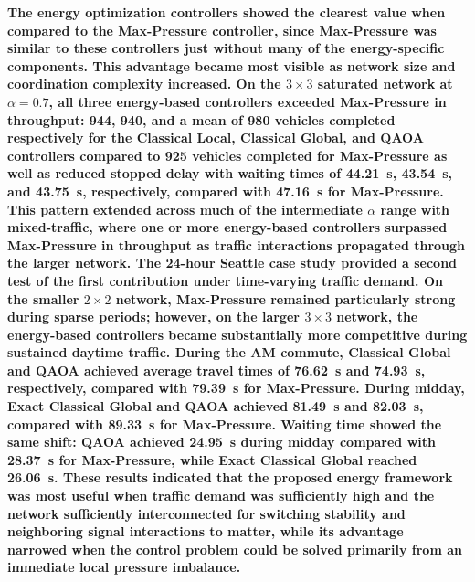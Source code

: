 \textbf{
The energy optimization controllers showed the clearest value when compared to the Max-Pressure controller, since Max-Pressure was similar to these controllers just without many of the energy-specific components. This advantage became most visible as network
size and coordination complexity increased. On the $3\times3$ saturated
network at $\alpha=0.7$, all three energy-based controllers exceeded
Max-Pressure in throughput: 944, 940, and a mean of 980 vehicles completed respectively for the Classical Local, Classical Global, and QAOA controllers compared to 925 vehicles completed for Max-Pressure as well as reduced stopped delay with waiting times of
44.21~s, 43.54~s, and 43.75~s, respectively, compared with 47.16~s for
Max-Pressure. This pattern extended across much of the intermediate
$\alpha$ range with mixed-traffic, where one or more energy-based controllers surpassed
Max-Pressure in throughput as traffic interactions propagated through the
larger network. The 24-hour Seattle case study provided a second test of the first contribution under
time-varying traffic demand. On the smaller $2\times2$ network, Max-Pressure remained particularly strong during sparse periods; however, on the larger $3\times3$ network, the energy-based controllers became substantially more competitive during sustained daytime traffic. During the AM
commute, Classical Global and QAOA achieved average travel times of
76.62~s and 74.93~s, respectively, compared with 79.39~s for Max-Pressure.
During midday, Exact Classical Global and QAOA achieved 81.49~s and
82.03~s, compared with 89.33~s for Max-Pressure. Waiting time showed the
same shift: QAOA achieved 24.95~s during midday compared with 28.37~s for
Max-Pressure, while Exact Classical Global reached 26.06~s. These results indicated that the proposed energy framework was most useful when traffic demand was sufficiently high and the
network sufficiently interconnected for switching stability and neighboring
signal interactions to matter, while its advantage narrowed when the control
problem could be solved primarily from an immediate local pressure imbalance.
}

